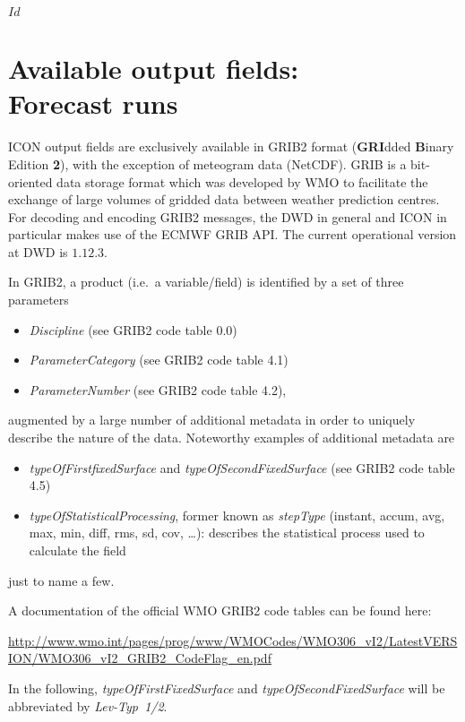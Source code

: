 \svnInfo $Id$
\chapter[Available output fields: Forecast runs]{Available output fields:\\ Forecast runs}

ICON output fields are exclusively available in GRIB2 format (\textbf{GRI}dded \textbf{B}inary Edition \textbf{2}), with the exception of 
meteogram data (NetCDF). GRIB is a bit-oriented data storage format which was developed by WMO to facilitate the exchange of large volumes of 
gridded data between weather prediction centres. For decoding and encoding GRIB2 messages, the DWD in general and ICON in particular 
makes use of the ECMWF GRIB API. The current operational version at DWD is $1.12.3$.
 
In GRIB2, a product (i.e.\ a variable/field) is identified by a set of three parameters
\begin{itemize}
 \item \emph{Discipline} (see GRIB2 code table 0.0)
 \item \emph{ParameterCategory} (see GRIB2 code table 4.1)
 \item \emph{ParameterNumber} (see GRIB2 code table 4.2), 
\end{itemize}
augmented by a large number of additional metadata in order to uniquely describe the nature of the data. Noteworthy examples 
of additional metadata are 
\begin{itemize}
  \item \emph{typeOfFirstfixedSurface} and \emph{typeOfSecondFixedSurface} (see GRIB2 code table 4.5)
  \item \emph{typeOfStatisticalProcessing}, former known as \emph{stepType} (instant, accum, avg, max, min, diff, rms, sd, cov, \dots): describes 
        the statistical process used to calculate the field
 \end{itemize}
just to name a few.

A documentation of the official WMO GRIB2 code tables can be found here: 

\begin{minipage}{\textwidth}
\url{http://www.wmo.int/pages/prog/www/WMOCodes/WMO306_vI2/LatestVERSION/WMO306_vI2_GRIB2_CodeFlag_en.pdf}
\end{minipage}

In the following, \emph{typeOfFirstFixedSurface} and \emph{typeOfSecondFixedSurface} will be abbreviated by \emph{Lev-Typ~1/2}.



